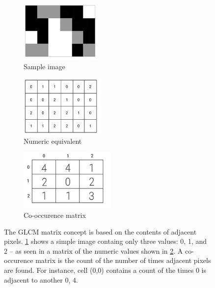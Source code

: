 \documentclass[letterpaper]{article}
\begin{document}
{\begin{figure}[H]
	\begin{subfigure}[h]{0.28\linewidth}
		\includegraphics[height=3cm]{./figures/glcm-example.jpg}
		\caption{Sample image}
		\label{subfig:glcm_sample}	
	\end{subfigure}
	\hfill
	\begin{subfigure}[h]{0.28\linewidth}
		\includegraphics[height=3cm]{./figures/glcm-numeric.jpg}
		\caption{Numeric equivalent}
		\label{subfig:glcm_numeric}		
	\end{subfigure}
	\hfill
	\begin{subfigure}[h]{0.28\linewidth}
		\includegraphics[height=3cm]{./figures/glcm-matrix.jpg}
		\caption{Co-occurence matrix}
		\label{subfig:glcm_matrix}		
	\end{subfigure}%
	\hfill
	\caption[GLCM matrix explained]{The GLCM matrix concept is based on the contents of adjacent pixels. \ref{subfig:glcm_sample} shows a simple image containg only three values: 0, 1, and 2 -- as seen in a matrix of the numeric values shown in \ref{subfig:glcm_numeric}. A co-occurence matrix is the count of the number of times adjacent pixels are found.  For instance, cell (0,0) contains a count of the times 0 is adjacent to another 0, 4.}
	\label{fig:glcm-explained}
\end{figure}
}
\end{document}
